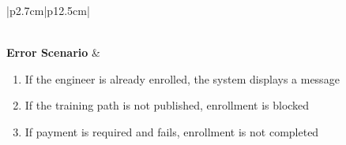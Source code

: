 \begin{table}[H]
\begin{tabular}{|p{2.7cm}|p{12.5cm}|}
\begin{minipage}[t]{\linewidth}
\begin{enumerate}[topsep=0pt,itemsep=1pt,parsep=0pt,partopsep=0pt]
                                          \end{enumerate}
                                      \end{minipage}    \\
            \hline
            \textbf{Error Scenario} & \begin{minipage}[t]{\linewidth}
                                          \begin{enumerate}[topsep=0pt,itemsep=1pt,parsep=0pt,partopsep=0pt]
                                              \item If the engineer is already enrolled, the system displays a message
                                              \item If the training path is not published, enrollment is blocked
                                              \item If payment is required and fails, enrollment is not completed
                                          \end{enumerate}
                                      \end{minipage}             \\
            \hline
        \end{tabular}
        \label{tab:eng-enroll}
    \end{table}
